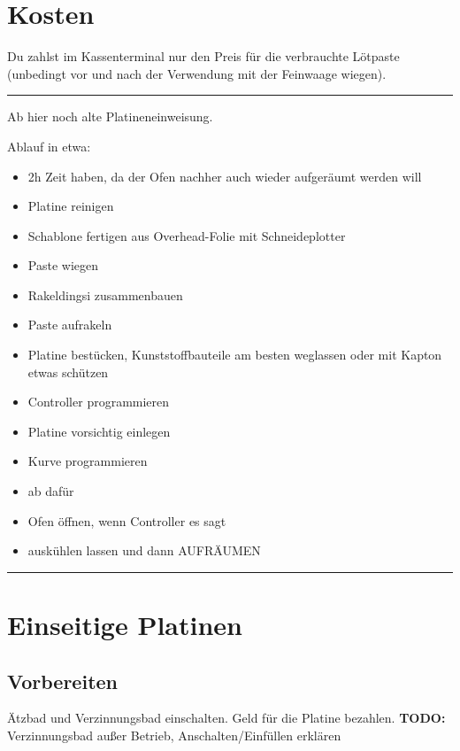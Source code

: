 \documentclass{\basedir/fablab-document}
\begin{document}
\section{Kosten}
Du zahlst im Kassenterminal nur den Preis für die verbrauchte Lötpaste (unbedingt vor und nach der Verwendung mit der Feinwaage wiegen). \\

\color{red}
\hrule
\begin{center}
\large{Ab hier noch alte Platineneinweisung.}

Ablauf in etwa:
\begin{itemize}
\item 2h Zeit haben, da der Ofen nachher auch wieder aufgeräumt werden will
\item Platine reinigen
\item Schablone fertigen aus Overhead-Folie mit Schneideplotter
\item Paste wiegen
\item Rakeldingsi zusammenbauen
\item Paste aufrakeln
\item Platine bestücken, Kunststoffbauteile am besten weglassen oder mit Kapton etwas schützen
\item Controller programmieren
\item Platine vorsichtig einlegen
\item Kurve programmieren
\item ab dafür
\item Ofen öffnen, wenn Controller es sagt
\item auskühlen lassen und dann AUFRÄUMEN
\end{itemize}
\vspace{0.1cm}
\end{center}
\hrule
\color{black}

\section{Einseitige Platinen}
\secttoc

\subsection{Vorbereiten}
\label{sec:vorbereiten}
Ätzbad und Verzinnungsbad einschalten. Geld für die Platine bezahlen. \textbf{TODO: } Verzinnungsbad außer Betrieb, Anschalten/Einfüllen erklären
\end{document}
